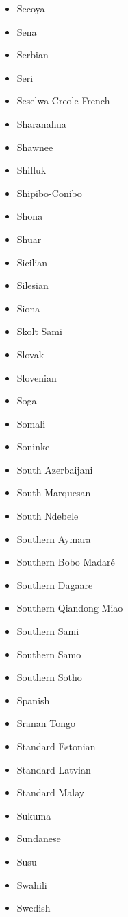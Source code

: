 \documentclass[paper=a4, 12pt]{scrbook}
\begin{document}
\begin{multicols}{3}
\begin{itemize}
        \item Secoya
        \item Sena
        \item Serbian
        \item Seri
        \item Seselwa Creole French
        \item Sharanahua
        \item Shawnee
        \item Shilluk
        \item Shipibo-Conibo
        \item Shona
        \item Shuar
        \item Sicilian
        \item Silesian
        \item Siona
        \item Skolt Sami
        \item Slovak
        \item Slovenian
        \item Soga
        \item Somali
        \item Soninke
        \item South Azerbaijani
        \item South Marquesan
        \item South Ndebele
        \item Southern Aymara
        \item Southern Bobo Madaré
        \item Southern Dagaare
        \item Southern Qiandong Miao
        \item Southern Sami
        \item Southern Samo
        \item Southern Sotho
        \item Spanish
        \item Sranan Tongo
        \item Standard Estonian
        \item Standard Latvian
        \item Standard Malay
        \item Sukuma
        \item Sundanese
        \item Susu
        \item Swahili
        \item Swedish

\end{itemize}
\end{multicols}
\end{document}
